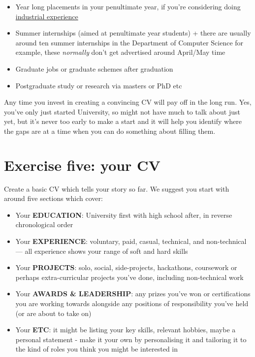 \documentclass[
]{book}
\providecommand{\tightlist}{%
  \setlength{\itemsep}{0pt}\setlength{\parskip}{0pt}}
\begin{document}
\begin{itemize}
\tightlist
\item
  Year long placements in your penultimate year, if you're considering doing \href{http://studentnet.cs.manchester.ac.uk/employment/placement/}{industrial experience}
\item
  Summer internships (aimed at penultimate year students)
  + there are usually around ten summer internships in the Department of Computer Science for example, these \emph{normally} don't get advertised around April/May time
\item
  Graduate jobs or graduate schemes after graduation
\item
  Postgraduate study or research via masters or PhD etc
\end{itemize}

Any time you invest in creating a convincing CV will pay off in the long run. Yes, you've only just started University, so might not have much to talk about just yet, but it's never too early to make a start and it will help you identify where the gaps are at a time when you can do something about filling them.

\section{Exercise five: your CV}\label{ex5}

Create a basic CV which tells your story so far. We suggest you start with around five sections which cover:

\begin{itemize}
\tightlist
\item
  Your \textbf{EDUCATION}: University first with high school after, in reverse chronological order
\item
  Your \textbf{EXPERIENCE}: voluntary, paid, casual, technical, and non-technical --- all experience shows your range of soft and hard skills
\item
  Your \textbf{PROJECTS}: solo, social, side-projects, hackathons, coursework or perhaps extra-curricular projects you've done, including non-technical work
\item
  Your \textbf{AWARDS \& LEADERSHIP}: any prizes you've won or certifications you are working towards alongside any positions of responsibility you've held (or are about to take on)
\item
  Your \textbf{ETC}: it might be listing your key skills, relevant hobbies, maybe a personal statement - make it your own by personalising it and tailoring it to the kind of roles you think you might be interested in
\end{itemize}
\end{document}
